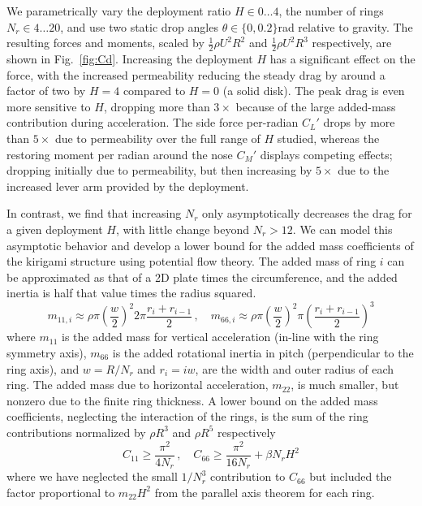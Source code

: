 \documentclass[lineno]{JFM-FLM_Au}
\begin{document}
We parametrically vary the deployment ratio $H \in 0\ldots 4$, the number of rings $N_r \in 4\ldots20$, and use two static drop angles $\theta \in \{0,0.2\}$rad relative to gravity. The resulting forces and moments, scaled by $\frac 12 \rho U^2 R^2$ and $\frac 12 \rho U^2 R^3$ respectively, are shown in Fig.~\ref{fig:Cd}. Increasing the deployment $H$ has a significant effect on the force, with the increased permeability reducing the steady drag by around a factor of two by $H=4$ compared to $H=0$ (a solid disk). The peak drag is even more sensitive to $H$, dropping more than $3\times$ because of the large added-mass contribution during acceleration. The side force per-radian $C_L'$ drops by more than $5\times$ due to permeability over the full range of $H$ studied, whereas the restoring moment per radian around the nose $C_M'$ displays competing effects; dropping initially due to permeability, but then increasing by $5\times$ due to the increased lever arm provided by the deployment.

In contrast, we find that increasing $N_r$ only asymptotically decreases the drag for a given deployment $H$, with little change beyond $N_r>12$. We can model this asymptotic behavior and develop a lower bound for the added mass coefficients of the kirigami structure using potential flow theory. The added mass of ring $i$ can be approximated as that of a 2D plate times the circumference, and the added inertia is half that value times the radius squared.
\begin{equation}
    m_{11,i} \approx \rho \pi\left(\frac w 2\right)^2 2\pi \frac{r_i+r_{i-1}}2\,,\quad  m_{66,i} \approx \rho \pi\left(\frac w 2\right)^2 \pi \left(\frac{r_i+r_{i-1}}2\right)^3
\end{equation}
where $m_{11}$ is the added mass for vertical acceleration (in-line with the ring symmetry axis), $m_{66}$ is the added rotational inertia in pitch (perpendicular to the ring axis), and $w = R/N_r$ and $r_i=iw$, are the width and outer radius of each ring. The added mass due to horizontal acceleration, $m_{22}$, is much smaller, but nonzero due to the finite ring thickness.
A lower bound on the added mass coefficients, neglecting the interaction of the rings,  is the sum of the ring contributions normalized by $\rho R^3$ and $\rho R^5$ respectively
\begin{equation}\label{eq:C11_C66}
    C_{11} \ge \frac{\pi^2}{4N_r}\,,\quad C_{66} \ge \frac {\pi^2} {16N_r} + \beta N_r H^2
\end{equation}
where we have neglected the small $1/N_r^3$ contribution to $C_{66}$ but included the factor proportional to $m_{22}H^2$ from the parallel axis theorem for each ring.
\end{document}
